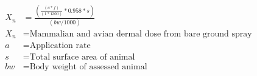 \documentclass[fleqn, oneside, 11pt]{article}%
\begin{document}
\begin{preview}
\begin{align*}%
X_{n} & = \frac{\left(\frac{\left(a*f\right)}{\left(1*1300\right)}*0.958*s\right)}{\left(bw/1000\right)} \nonumber \\
X_{n} & =  \text{Mammalian and avian dermal dose from bare ground spray} \nonumber \\
a & =  \text{Application rate} \nonumber \\
s & =  \text{Total surface area of animal} \nonumber \\
bw & =  \text{Body weight of assessed animal} \nonumber \\
\end{align*} 
\end{preview}
\end{document}
